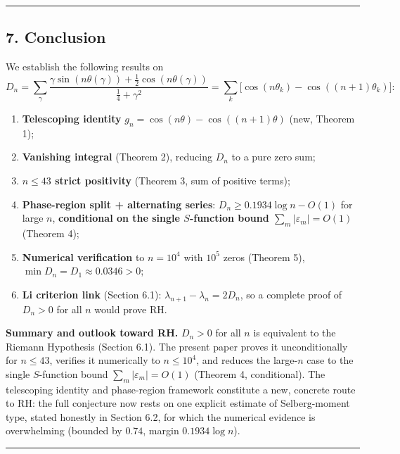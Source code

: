 \documentclass[
]{article}
\providecommand{\tightlist}{%
  \setlength{\itemsep}{0pt}\setlength{\parskip}{0pt}}
\begin{document}
\begin{center}\rule{0.5\linewidth}{0.5pt}\end{center}

\hypertarget{conclusion}{%
\subsection{7. Conclusion}\label{conclusion}}

We establish the following results on
\[D_n = \sum_\gamma \frac{\gamma\sin(n\theta(\gamma)) + \tfrac12\cos(n\theta(\gamma))}{\tfrac14 + \gamma^2} = \sum_k\big[\cos(n\theta_k)-\cos((n+1)\theta_k)\big]:\]

\begin{enumerate}
\def\labelenumi{\arabic{enumi}.}
\tightlist
\item
  \textbf{Telescoping identity}
  \(g_n = \cos(n\theta) - \cos((n+1)\theta)\) (new, Theorem 1);
\item
  \textbf{Vanishing integral} (Theorem 2), reducing \(D_n\) to a pure
  zero sum;
\item
  \textbf{\(n \le 43\) strict positivity} (Theorem 3, sum of positive
  terms);
\item
  \textbf{Phase-region split + alternating series}:
  \(D_n \ge 0.1934\log n - O(1)\) for large \(n\), \textbf{conditional
  on the single \(S\)-function bound \(\sum_m|\varepsilon_m|=O(1)\)}
  (Theorem 4);
\item
  \textbf{Numerical verification} to \(n = 10^4\) with \(10^5\) zeros
  (Theorem 5), \(\min D_n = D_1 \approx 0.0346 > 0\);
\item
  \textbf{Li criterion link} (Section 6.1):
  \(\lambda_{n+1}-\lambda_n = 2D_n\), so a complete proof of \(D_n>0\)
  for all \(n\) would prove RH.
\end{enumerate}

\textbf{Summary and outlook toward RH.} \(D_n>0\) for all \(n\) is
equivalent to the Riemann Hypothesis (Section 6.1). The present paper
proves it unconditionally for \(n\le43\), verifies it numerically to
\(n\le10^4\), and reduces the large-\(n\) case to the single
\(S\)-function bound \(\sum_m|\varepsilon_m|=O(1)\) (Theorem 4,
conditional). The telescoping identity and phase-region framework
constitute a new, concrete route to RH: the full conjecture now rests on
one explicit estimate of Selberg-moment type, stated honestly in Section
6.2, for which the numerical evidence is overwhelming (bounded by
\(0.74\), margin \(0.1934\log n\)).

\begin{center}\rule{0.5\linewidth}{0.5pt}\end{center}
\end{document}
